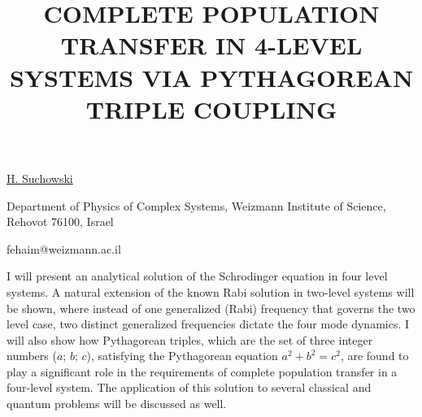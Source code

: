 \title{COMPLETE POPULATION TRANSFER IN 4-LEVEL SYSTEMS VIA PYTHAGOREAN TRIPLE COUPLING}

\underline{H. Suchowski} 

{\normalsize{\vspace{-4mm}
Department of Physics of Complex Systems, Weizmann Institute of Science, Rehovot 76100, Israel

\email fehaim@weizmann.ac.il}}

I will present an analytical solution of the Schrodinger equation
in four level systems. A natural extension of the known Rabi solution in two-level systems will be shown, where instead of one generalized (Rabi) frequency that governs the two level case,
two distinct generalized frequencies dictate the four mode dynamics. I will also show how Pythagorean triples, which are the set of three integer numbers ($a$; $b$; $c$), satisfying the
Pythagorean equation $a^2 + b^2 = c^2$, are found to play a significant role in the
requirements of complete population transfer in a four-level system.
The application of this solution to several classical and quantum problems will be discussed as well.

\vspace{\baselineskip} 